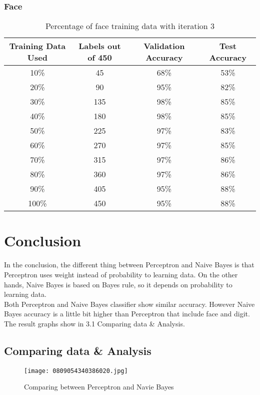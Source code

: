 \documentclass{article}
\begin{document}
        \subsubsection{Face}
            \begin{table}[h]
                \centering
                \begin{tabular}{c|c|c|c}
                    \hline
                        Training Data Used & Labels out of 450 & Validation Accuracy & Test Accuracy \\
                    \hline
                        10\% & 45 & 68\% & 53\%\\
                    \hline
                        20\% & 90 & 95\% & 82\%\\
                    \hline
                        30\% & 135 & 98\% & 85\%\\
                    \hline
                        40\% & 180 & 98\% & 85\%\\
                    \hline
                        50\% & 225 & 97\% & 83\%\\
                    \hline
                        60\% & 270 & 97\% & 85\%\\
                    \hline
                        70\% & 315 & 97\% & 86\%\\
                    \hline
                        80\% & 360 & 97\% & 86\%\\
                    \hline
                        90\% & 405 & 95\% & 88\%\\
                    \hline
                        100\% & 450 & 95\% & 88\%\\
                    \hline
                \end{tabular}
                \caption{Percentage of face training data with iteration 3}
            \end{table}
\section{Conclusion}
\hspace*{10mm}In the conclusion, the different thing between Perceptron and Naive Bayes is that Perceptron uses weight instead of probability to learning data. On the other hands, Naive Bayes is based on Bayes rule, so it depends on probability to learning data.\\
Both Perceptron and Naive Bayes classifier show similar accuracy. However Naive Bayes accuracy is a little bit higher than Perceptron that include face and digit. The result graphs show in 3.1 Comparing data \& Analysis.


    \newpage
    \subsection{Comparing data \& Analysis }
\begin{figure}[h]
    \centering
    \texttt{[image: 0809054340386020.jpg]}
    \caption{Comparing between Perceptron and Navie Bayes}
\end{figure}
\end{document}
